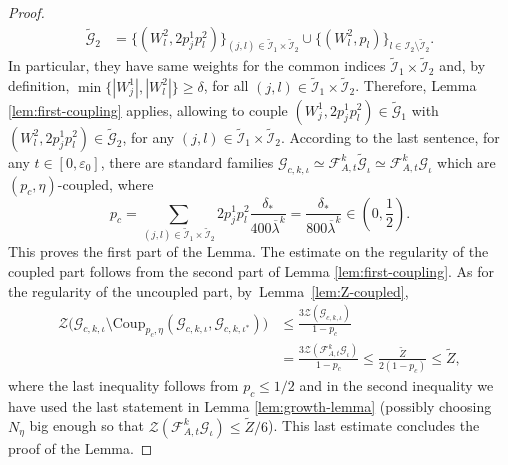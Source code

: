 \documentclass{amsart}
\numberwithin{equation}{section}
\newcommand\ve{\varepsilon}
\renewcommand{\ge}{\geqslant}
\renewcommand{\le}{\leqslant}
\newcommand\cF{{\mathcal F}}
\newcommand\cG{{\mathcal G}}
\newcommand\cI{{\mathcal I}}
\newcommand\cZ{{\mathcal Z}}
\newcommand{\catt}{\cF_{A,t}}
\newcommand{\Coup}{\text{Coup}}
\begin{document}
\begin{proof}
\[\begin{split}
  \widetilde \cG_{2} &= \{(W^{2}_{l}, 2p^1_{j}p^{2}_{l})\}_{(j,l) \in \widetilde \cI_{1} \times \widetilde \cI_{2}} \cup \{(W_l^{2}, p_l)\}_{l \in \cI_{2} \setminus \widetilde\cI_{2}}.
\end{split}
\]
In particular, they have same weights for the common indices \(\widetilde\cI_{1} \times \widetilde \cI_{2}\) and, by definition, \(\min\{|W^1_{j}|, |W^2_{l}|\} \ge \delta\), for all \((j,l) \in \widetilde\cI_{1}\times \widetilde \cI_2\). Therefore, Lemma \ref{lem:first-coupling} applies, allowing to couple \((W^{1}_{j}, 2p^1_{j}p^{2}_{l}) \in \widetilde \cG_1\) with \((W^{2}_{l}, 2p^1_{j}p^{2}_{l}) \in \widetilde \cG_2\), for any \((j,l) \in \widetilde\cI_{1}\times \widetilde\cI_2\). According to the last sentence, for any \(t \in [0,\ve_0]\), there are standard families \(\cG_{c,k,\iota} \simeq \catt^{k}\widetilde \cG_{\iota} \simeq \catt^{k}\cG_{\iota} \) which are \((p_{c}, \eta)\)-coupled, where 
\[
    p_{c} = \sum_{(j,l) \in \widetilde \cI_{1}\times \widetilde\cI_2}2p^1_{j}p^2_{l} \frac{\delta_{*}}{400 \overline \lambda^{k}} = \frac{\delta_{*}}{800 \overline \lambda^{k}} \in \left(0,\frac 1 2\right).
\]
This proves the first part of the Lemma. The estimate on the regularity of the coupled part follows from the second part of Lemma \ref{lem:first-coupling}. As for the regularity of the uncoupled part, \mbox{by Lemma \ref{lem:Z-coupled},}
\[
\begin{split}
    \cZ\bigl(\cG_{c,k,\iota} \setminus  \Coup_{p_c, \eta} (\cG_{c,k,\iota}, \cG_{c,k,\iota^*})\bigr) &\le \frac{3\cZ (\cG_{c,k,\iota})}{1-p_c} \\
    &= \frac{3\cZ(\catt^{k} \cG_\iota)}{1-p_c} \le  \frac{\widetilde Z}{2(1-p_c)} \le \widetilde Z,
\end{split}
\]
where the last inequality follows from \(p_c \le 1/2\) and in the second inequality we have used the last statement in Lemma \ref{lem:growth-lemma} (possibly choosing \(N_{\eta}\) big enough so that \(\cZ(\catt^{k} \cG_\iota) \le \widetilde Z /6\)). This last estimate concludes the proof of the Lemma.
\end{proof}
\end{document}
